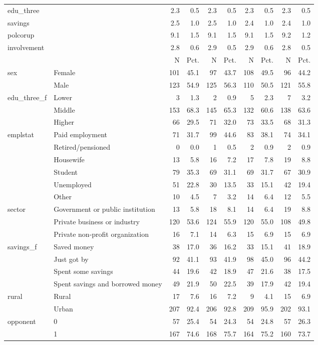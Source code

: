 \begin{table}
\begin{tabular}[t]{llrrrrrrrr}
edu\_three &  & 2.3 & 0.5 & 2.3 & 0.5 & 2.3 & 0.5 & 2.3 & 0.5\\
savings &  & 2.5 & 1.0 & 2.5 & 1.0 & 2.4 & 1.0 & 2.4 & 1.0\\
polcorup &  & 9.1 & 1.5 & 9.1 & 1.5 & 9.1 & 1.5 & 9.2 & 1.2\\
involvement &  & 2.8 & 0.6 & 2.9 & 0.5 & 2.9 & 0.6 & 2.8 & 0.5\\
\midrule
 &  & N & Pct. & N & Pct. & N & Pct. & N & Pct.\\
sex & Female & 101 & 45.1 & 97 & 43.7 & 108 & 49.5 & 96 & 44.2\\
 & Male & 123 & 54.9 & 125 & 56.3 & 110 & 50.5 & 121 & 55.8\\
edu\_three\_f & Lower & 3 & 1.3 & 2 & 0.9 & 5 & 2.3 & 7 & 3.2\\
 & Middle & 153 & 68.3 & 145 & 65.3 & 132 & 60.6 & 138 & 63.6\\
 & Higher & 66 & 29.5 & 71 & 32.0 & 73 & 33.5 & 68 & 31.3\\
emplstat & Paid employment & 71 & 31.7 & 99 & 44.6 & 83 & 38.1 & 74 & 34.1\\
 & Retired/pensioned & 0 & 0.0 & 1 & 0.5 & 2 & 0.9 & 2 & 0.9\\
 & Housewife & 13 & 5.8 & 16 & 7.2 & 17 & 7.8 & 19 & 8.8\\
 & Student & 79 & 35.3 & 69 & 31.1 & 69 & 31.7 & 67 & 30.9\\
 & Unemployed & 51 & 22.8 & 30 & 13.5 & 33 & 15.1 & 42 & 19.4\\
 & Other & 10 & 4.5 & 7 & 3.2 & 14 & 6.4 & 12 & 5.5\\
sector & Government or public institution & 13 & 5.8 & 18 & 8.1 & 14 & 6.4 & 19 & 8.8\\
 & Private business or industry & 120 & 53.6 & 124 & 55.9 & 120 & 55.0 & 108 & 49.8\\
 & Private non-profit organization & 16 & 7.1 & 14 & 6.3 & 15 & 6.9 & 15 & 6.9\\
savings\_f & Saved money & 38 & 17.0 & 36 & 16.2 & 33 & 15.1 & 41 & 18.9\\
 & Just got by & 92 & 41.1 & 93 & 41.9 & 98 & 45.0 & 96 & 44.2\\
 & Spent some savings & 44 & 19.6 & 42 & 18.9 & 47 & 21.6 & 38 & 17.5\\
 & Spent savings and
borrowed money & 49 & 21.9 & 50 & 22.5 & 39 & 17.9 & 42 & 19.4\\
rural & Rural & 17 & 7.6 & 16 & 7.2 & 9 & 4.1 & 15 & 6.9\\
 & Urban & 207 & 92.4 & 206 & 92.8 & 209 & 95.9 & 202 & 93.1\\
opponent & 0 & 57 & 25.4 & 54 & 24.3 & 54 & 24.8 & 57 & 26.3\\
 & 1 & 167 & 74.6 & 168 & 75.7 & 164 & 75.2 & 160 & 73.7\\
\bottomrule
\end{tabular}
\end{table}
